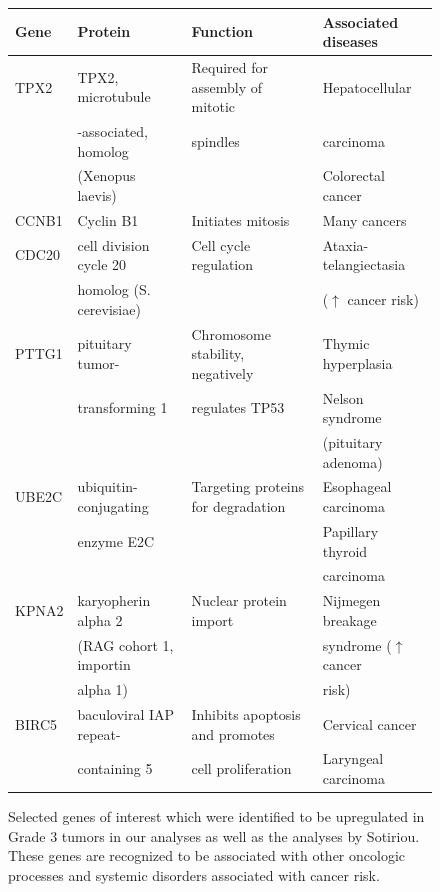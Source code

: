 \documentclass[a4paper,10pt]{article}
\begin{document}
\begin{figure}
\begin{tabular}{| l | l | l | l | }
    \hline
\textbf{Gene} & \textbf{Protein} & \textbf{Function} & \textbf{Associated diseases}\\ \hline 
TPX2 & TPX2, microtubule & Required for assembly of mitotic & Hepatocellular \\
 &  -associated, homolog  & spindles & carcinoma \\
 & (Xenopus laevis) &   &  Colorectal cancer
\\ \hline
CCNB1 & Cyclin B1 & Initiates mitosis & Many cancers\\ \hline 
CDC20 & cell division cycle 20 & Cell cycle regulation & Ataxia-telangiectasia \\
 & homolog (S. cerevisiae)  & &  ($\uparrow$ cancer risk) 
\\ \hline
PTTG1 & pituitary tumor- & Chromosome stability, negatively & Thymic hyperplasia\\
 & transforming 1 & regulates TP53 &  Nelson syndrome \\
 & & & (pituitary adenoma)
\\ \hline 
UBE2C & ubiquitin-conjugating & Targeting proteins for degradation & Esophageal carcinoma \\
 & enzyme E2C  & & Papillary thyroid \\
 & & & carcinoma
\\ \hline 
KPNA2 & karyopherin alpha 2 & Nuclear protein import & Nijmegen breakage \\
 & (RAG cohort 1, importin & & syndrome ($\uparrow$ cancer \\
 & alpha 1) &  &   risk) 
\\ \hline 
BIRC5 & baculoviral IAP repeat- &  Inhibits apoptosis and promotes & Cervical cancer \\
 & containing 5 & cell proliferation &  Laryngeal carcinoma
\\ \hline
\end{tabular}
\caption{Selected genes of interest which were identified to be upregulated in 
Grade 3 tumors in our analyses as well as the analyses by Sotiriou.  
These genes are recognized to be associated with other oncologic 
processes and systemic disorders associated with cancer risk.}\label{T3}
\end{figure}
\end{document}

